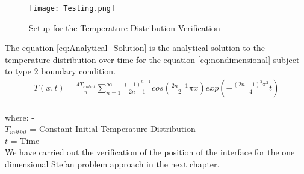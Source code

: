 \begin{figure}[htb]
  \centering
  \texttt{[image: Testing.png]}\\
  \caption{Setup for the Temperature Distribution Verification}
  \label{fig:Temperature_Distribution}
\end{figure}
The equation \eqref{eq:Analytical_Solution} \cite{Hancock}is the analytical solution to the temperature distribution over time for the equation \eqref{eq:nondimensional} subject to type 2 boundary condition.\\
\begin{subequations}
\begin{align}
    T(x,t) = \frac{4 T_{initial}}{\pi} \sum_{n=1}^{\infty} \frac{(-1)^{n+1}}{2n-1}cos \left ( \frac{2n-1}{2} \pi x \right) exp  \left (- \frac{(2n-1)^2 \pi^2}{4}t\right)\label{eq:Analytical_Solution}
\end{align}
\end{subequations}\\
where: -\\
\indent $T_{initial}$ = Constant Initial Temperature Distribution\\
\indent $t$ = Time\\
We have carried out the verification of the position of the interface for the one dimensional Stefan problem approach in the next chapter. 